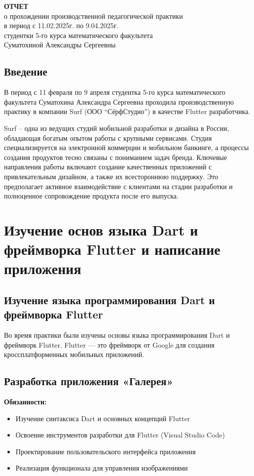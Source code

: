 \documentclass[a4paper, 12pt]{extarticle}
\begin{document}
\begin{center}
    \textbf{ОТЧЕТ}\\
    о прохождении производственной педагогической практики\\
    в период с 11.02.2025г. по 9.04.2025г.\\
    студентки 5-го курса математического факультета\\
    Суматохиной Александры Сергеевны
    \end{center}

\subsection*{Введение}

В период с 11 февраля по 9 апреля студентка 5-го курса математического факультета Суматохина Александра Сергеевна проходила производственную практику в компании Surf (ООО “СёрфСтудио”) в качестве Flutter разработчика.

Surf – одна из ведущих студий мобильной разработки и дизайна в России, обладающая богатым опытом работы с крупными сервисами. Студия специализируется на электронной коммерции и мобильном банкинге, а процессы создания продуктов тесно связаны с пониманием задач бренда. Ключевые направления работы включают создание качественных приложений с привлекательным дизайном, а также их всестороннюю поддержку. Это предполагает активное взаимодействие с клиентами на стадии разработки и полноценное сопровождение продукта после его выпуска.

\section{Изучение основ языка Dart и фреймворка Flutter и написание приложения}
\subsection{Изучение языка программирования Dart и фреймворка Flutter}
Во время практики были изучены основы языка программирования Dart и фреймворк Flutter. Flutter — это фреймворк от Google для создания кроссплатформенных мобильных приложений.

\subsection{Разработка приложения «Галерея»}
\textbf{Обязанности:}
\begin{itemize}
    \item Изучение синтаксиса Dart и основных концепций Flutter
    \item Освоение инструментов разработки для Flutter (Visual Studio Code)
    \item Проектирование пользовательского интерфейса приложения
    \item Реализация функционала для управления изображениями
\end{itemize}
\end{document}
